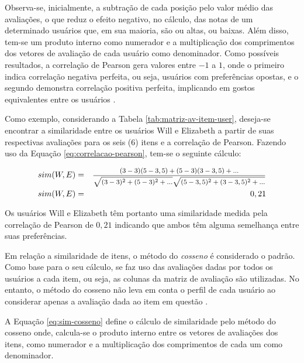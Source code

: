          Observa-se, inicialmente, a subtração de cada posição pelo valor médio das avaliações, o que reduz o efeito negativo, no cálculo, das notas de um determinado usuários que, em sua maioria, são ou altas, ou baixas. Além disso, tem-se um produto interno como numerador e a multiplicação dos comprimentos dos vetores de avaliação de cada usuário como denominador. Como possíveis resultados, a correlação de Pearson gera valores entre $-1$ a $1$, onde o primeiro indica correlação negativa perfeita, ou seja, usuários com preferências opostas, e o segundo demonstra correlação positiva perfeita, implicando em gostos equivalentes entre os usuários \cite{Jannach2010}.
        
        
        Como exemplo, considerando a Tabela \ref{tab:matriz-av-item-user}, deseja-se encontrar a similaridade entre os usuários Will e Elizabeth a partir de suas respectivas avaliações para os seis (6) itens e a correlação de Pearson. Fazendo uso da Equação \ref{eq:correlacao-pearson}, tem-se o seguinte cálculo:
        
        \begin{eqnarray}
            sim(W, E) &=& \text{\footnotesize   $\frac{(3-3)(5-3,5)+(5-3)(3-3,5)+...}{\sqrt{(3-3)^2+(5-3)^2+...}\sqrt{(5-3,5)^2+(3-3,5)^2+...}} $} \nonumber \\
            sim(W, E) &=& 0,21 \nonumber
        \end{eqnarray}
    
        Os usuários Will e Elizabeth têm portanto uma similaridade medida pela correlação de Pearson de $0,21$ indicando que ambos têm alguma semelhança entre suas preferências.
    
        Em relação a similaridade de itens, o método do \textit{cosseno} é considerado o padrão. Como base para o seu cálculo, se faz uso das avaliações dadas por todos os usuários a cada item, ou seja, as colunas da matriz de avaliação são utilizadas. No entanto, o método do cosseno não leva em conta o perfil de cada usuário ao considerar apenas a avaliação dada ao item em questão \cite{Jannach2010}.
        
        A Equação \ref{eq:sim-cosseno} define o cálculo de similaridade pelo método do cosseno onde, calcula-se o produto interno entre os vetores de avaliações dos itens, como numerador e a multiplicação dos comprimentos de cada um como denominador.         
        
